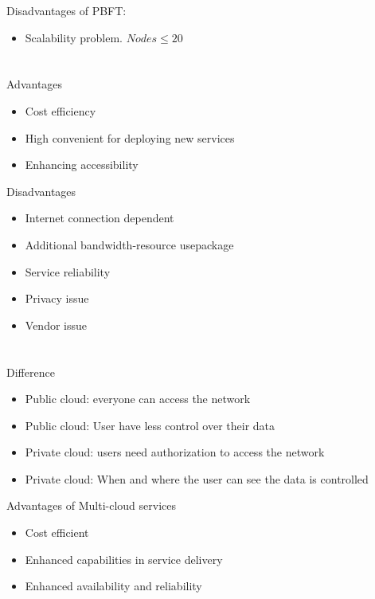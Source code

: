 \documentclass{article}
\begin{document}
        Disadvantages of PBFT:
        \begin{itemize}
            \item Scalability problem. $Nodes\leq 20$
        \end{itemize}

    \section{}
        Advantages
        \begin{itemize}
            \item Cost efficiency
            \item High convenient for deploying new services
            \item Enhancing accessibility
        \end{itemize}
        Disadvantages
        \begin{itemize}
            \item Internet connection dependent
            \item Additional bandwidth-resource usepackage
            \item Service reliability
            \item Privacy issue
            \item Vendor issue
        \end{itemize}
    \section{}
        Difference
        \begin{itemize}
            \item Public cloud: everyone can access the network
            \item Public cloud: User have less control over their data
            \item Private cloud: users need authorization to access the network
            \item Private cloud: When and where the user can see the data is controlled
        \end{itemize}
        Advantages of Multi-cloud services
        \begin{itemize}
            \item Cost efficient
            \item Enhanced capabilities in service delivery
            \item Enhanced availability and reliability
        \end{itemize}
\end{document}
